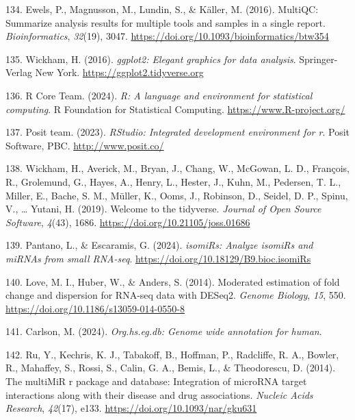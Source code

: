 \documentclass[
  11pt,
  letterpaper,
]{book}
\newlength{\cslhangindent}
\newenvironment{CSLReferences}[2] %
 {\begin{list}{}{%
  \setlength{\itemindent}{0pt}
  \setlength{\leftmargin}{0pt}
  \setlength{\parsep}{0pt}
  \ifodd #1
   \setlength{\leftmargin}{\cslhangindent}
   \setlength{\itemindent}{-1\cslhangindent}
  \fi
  \setlength{\itemsep}{#2\baselineskip}}}
 {\end{list}}
\begin{document}
\begin{CSLReferences}{1}{0}
134. Ewels, P., Magnusson, M., Lundin, S., \& Käller, M. (2016).
MultiQC: Summarize analysis results for multiple tools and samples in a
single report. \emph{Bioinformatics}, \emph{32}(19), 3047.
\url{https://doi.org/10.1093/bioinformatics/btw354}

135. Wickham, H. (2016). \emph{ggplot2: Elegant graphics for data
analysis}. Springer-Verlag New York. \url{https://ggplot2.tidyverse.org}

136. R Core Team. (2024). \emph{R: A language and environment for
statistical computing}. R Foundation for Statistical Computing.
\url{https://www.R-project.org/}

137. Posit team. (2023). \emph{RStudio: Integrated development
environment for r}. Posit Software, PBC. \url{http://www.posit.co/}

138. Wickham, H., Averick, M., Bryan, J., Chang, W., McGowan, L. D.,
François, R., Grolemund, G., Hayes, A., Henry, L., Hester, J., Kuhn, M.,
Pedersen, T. L., Miller, E., Bache, S. M., Müller, K., Ooms, J.,
Robinson, D., Seidel, D. P., Spinu, V., \ldots{} Yutani, H. (2019).
Welcome to the {tidyverse}. \emph{Journal of Open Source Software},
\emph{4}(43), 1686. \url{https://doi.org/10.21105/joss.01686}

139. Pantano, L., \& Escaramis, G. (2024). \emph{isomiRs: Analyze
isomiRs and miRNAs from small RNA-seq}.
\url{https://doi.org/10.18129/B9.bioc.isomiRs}

140. Love, M. I., Huber, W., \& Anders, S. (2014). Moderated estimation
of fold change and dispersion for RNA-seq data with DESeq2. \emph{Genome
Biology}, \emph{15}, 550.
\url{https://doi.org/10.1186/s13059-014-0550-8}

141. Carlson, M. (2024). \emph{Org.hs.eg.db: Genome wide annotation for
human}.

142. Ru, Y., Kechris, K. J., Tabakoff, B., Hoffman, P., Radcliffe, R.
A., Bowler, R., Mahaffey, S., Rossi, S., Calin, G. A., Bemis, L., \&
Theodorescu, D. (2014). The multiMiR r package and database: Integration
of microRNA target interactions along with their disease and drug
associations. \emph{Nucleic Acids Research}, \emph{42}(17), e133.
\url{https://doi.org/10.1093/nar/gku631}


\end{CSLReferences}
\end{document}
